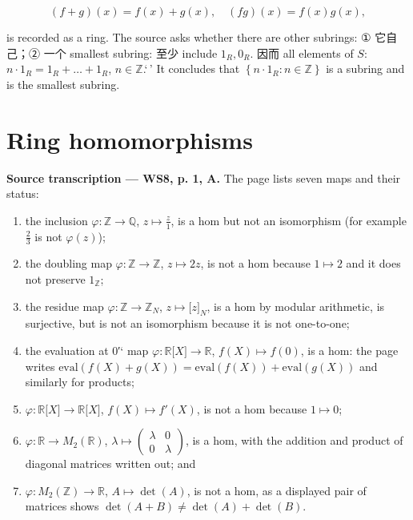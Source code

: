 \[\left( {f + g} \right)(x) = f(x) + g(x),\quad\left( {fg} \right)(x) = f(x)g(x),\]

is recorded as a ring. The source asks whether there are other subrings: ① 它自己；② 一个 smallest subring: 至少 include \(1_{R},0_{R}\). 因而 all elements of \(S\): \(n \cdot 1_{R} = 1_{R} + \ldots + 1_{R}\), \(n \in \mathbb{Z}\).`\,' It concludes that \(\left\{ {n \cdot 1_{R}:n \in \mathbb{Z}} \right\}\) is a subring and is the smallest subring.

\section{Ring homomorphisms}

\textbf{Source transcription --- WS8, p. 1, A.} The page lists seven maps and their status:

\begin{enumerate}
\tightlist
\item
  the inclusion \(\varphi:\mathbb{Z}\rightarrow\mathbb{Q}\), \(z\mapsto\frac{z}{1}\), is a hom but not an isomorphism (for example \(\frac{2}{3}\) is not \(\varphi(z)\));
\item
  the doubling map \(\varphi:\mathbb{Z}\rightarrow\mathbb{Z}\), \(z\mapsto 2z\), is not a hom because \(1\mapsto 2\) and it does not preserve \(1_{\mathbb{Z}}\);
\item
  the residue map \(\varphi:\mathbb{Z}\rightarrow\mathbb{Z}_{N}\), \(z\mapsto\lbrack z\rbrack_{N}\), is a hom by modular arithmetic, is surjective, but is not an isomorphism because it is not one-to-one;
\item
  the evaluation at \(0\)′` map \(\varphi:\mathbb{R}\lbrack X\rbrack\rightarrow\mathbb{R}\), \(f(X)\mapsto f(0)\), is a hom: the page writes \(\text{eval}\left( {f(X) + g(X)} \right) = \text{eval}\left( {f(X)} \right) + \text{eval}\left( {g(X)} \right)\) and similarly for products;
\item
  \(\varphi:\mathbb{R}\lbrack X\rbrack\rightarrow\mathbb{R}\lbrack X\rbrack\), \(f(X)\mapsto f'(X)\), is not a hom because \(1\mapsto 0\);
\item
  \(\varphi:\mathbb{R}\rightarrow M_{2}\left( \mathbb{R} \right)\), \(\lambda\mapsto\begin{pmatrix}
  \lambda & 0 \\
  0 & \lambda
  \end{pmatrix}\), is a hom, with the addition and product of diagonal matrices written out; and
\item
  \(\varphi:M_{2}\left( \mathbb{Z} \right)\rightarrow\mathbb{R}\), \(A\mapsto\det(A)\), is not a hom, as a displayed pair of matrices shows \(\det\left( {A + B} \right) \neq \det(A) + \det(B)\).
\end{enumerate}

